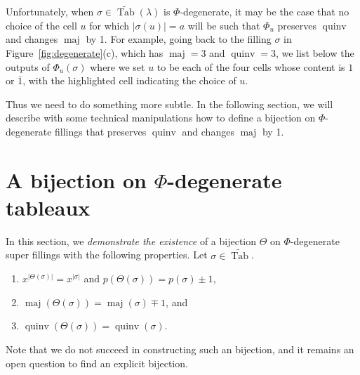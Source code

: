 \documentclass[ALCO,Unicode]{cedram}
\DeclareMathOperator{\PQT}{Tab}
\DeclareMathOperator{\maj}{maj}
\DeclareMathOperator{\quinv}{quinv}
\newcommand\cell[3]{
\def\i{#1} \def\j{#2} \def\entry{#3}

\draw (\j-1,-\i)--(\j,-\i)--(\j,-\i+1)--(\j-1,-\i+1)--(\j-1,-\i);
\node at (\j-.5,-\i+.5) {\entry};
}
\newcommand\graycell[3]{
\def\i{#1} \def\j{#2} \def\entry{#3}
\draw[fill=gray!60](\j-1,-\i)--(\j,-\i)--(\j,-\i+1)--(\j-1,-\i+1)--(\j-1,-\i);
\node at (\j-.5,-\i+.5) {\entry};
}
\begin{document}
Unfortunately, when $\sigma\in\widetilde{\PQT}(\lambda)$ is $\Phi$-degenerate, it may be the case that no choice of the cell $u$ for which $|\sigma(u)|=a$ will be such that $\Phi_u$ preserves $\quinv$ and changes $\maj$ by 1. For example, going back to the filling $\sigma$ in Figure~\ref{fig:degenerate}(c), which has $\maj=3$ and $\quinv=3$, we list below the outputs of $\Phi_u(\sigma)$ where we set $u$ to be each of the four cells whose content is $1$ or $\bar{1}$, with the highlighted cell indicating the choice of $u$.

\begin{center}
\quad
{}
\quad
{}
\quad
{}
\end{center}


Thus we need to do something more subtle. In the following section, we will describe with some technical manipulations how to define a bijection on $\Phi$-degenerate fillings that preserves $\quinv$ and changes $\maj$ by 1. 


\section{A bijection on $\Phi$-degenerate tableaux}
\label{sec:Phi-degenerate}

In this section, we \emph{demonstrate the existence} of a bijection $\Theta$ on $\Phi$-degenerate super fillings with the following properties. Let $\sigma\in\widetilde{\PQT}$. 
\begin{enumerate}[label=\roman*.]
\item $x^{|\Theta(\sigma)|}=x^{|\sigma|}$ and $p(\Theta(\sigma))=p(\sigma)  \pm 1$,
\item $\maj(\Theta(\sigma))=\maj(\sigma)\mp 1$, and
\item $\quinv(\Theta(\sigma))=\quinv(\sigma)$.
\end{enumerate}
Note that we do not succeed in constructing such an bijection, and it remains an open question to find an explicit bijection.
\end{document}
